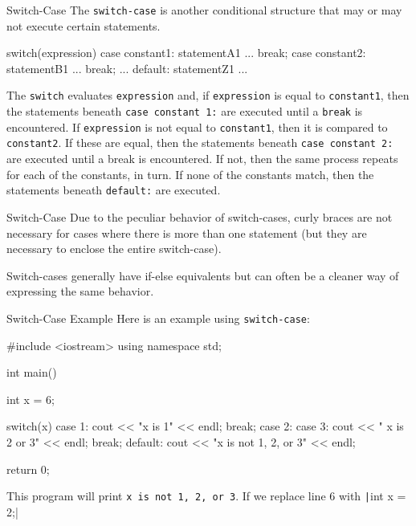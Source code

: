 \documentclass[../lecture3-flowofcontrol.tex]{subfiles}
\begin{document}

\begin{frame}[fragile]{Switch-Case}
    The \verb|switch-case| is another conditional structure that may or may not execute certain statements.

\begin{cppcode}[]
switch(expression)
{
    case constant1:
            statementA1
            ...
            break;
    case constant2:
            statementB1
            ...
            break;
    ...
    default:
            statementZ1
            ...
}
\end{cppcode}
    \begin{multicols}{2}
        The \texttt{switch} evaluates \texttt{expression} and, if \texttt{expression} is equal to \texttt{constant1}, then the statements beneath \texttt{case constant 1:} are executed until a \texttt{break} is encountered. If \texttt{expression} is not equal to \texttt{constant1}, then it is compared to \texttt{constant2}. If these are equal, then the statements beneath \texttt{case constant 2:} are executed until a break is encountered. If not, then the same process repeats for each of the constants, in turn. If none of the constants match, then the statements beneath \texttt{default:} are executed.
    \end{multicols}
\end{frame}

\begin{frame}[fragile]{Switch-Case}
    Due to the peculiar behavior of switch-cases, curly braces are not necessary for cases where there is more than one statement (but they are necessary to enclose the entire switch-case). \newline \newline

    Switch-cases generally have if-else equivalents but can often be a cleaner way of expressing the same behavior.
\end{frame}

\begin{frame}[fragile]{Switch-Case Example}
    Here is an example using \verb|switch-case|:
\begin{cppcode}[]
#include <iostream>
using namespace std;

int main()
{
    int x = 6;

    switch(x)
    {
        case 1:
            cout << "x is 1" << endl;
            break;
        case 2:
        case 3:
            cout << " x is 2 or 3" << endl;
            break;
        default:
            cout << "x is not 1, 2, or 3" << endl;
    }

    return 0;
}
\end{cppcode}

    This program will print \verb|x is not 1, 2, or 3|. If we replace line 6 with \texttt|int x = 2;|
\end{frame}

\end{document}
